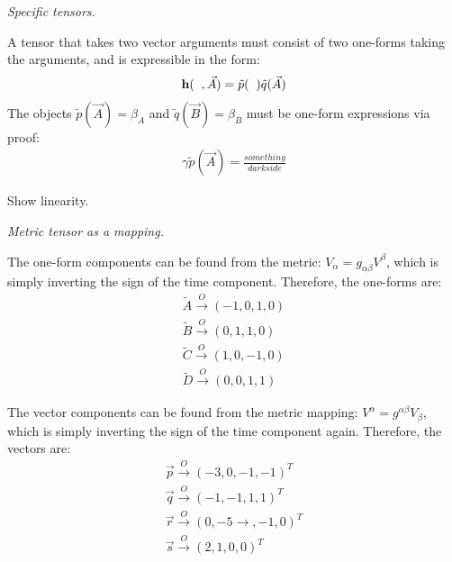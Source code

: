 \documentclass{report}
\begin{document}
\begin{subquests}
	\item \emph{Specific tensors.}
	\begin{subquests}
		\item
		A tensor that takes two vector arguments must consist of two one-forms taking the arguments, and is expressible in the form:
		\begin{gather*}
			{\vb h}(\;\;,\vec A) = \tilde{p}(\;\;)\tilde{q}(\vec A)
		\end{gather*}
		The objects $\tilde{p}(\vec A) = \beta_{A}$ and $\tilde{q}(\vec B) = \beta_B$ must be one-form expressions via proof:
		\begin{gather*}
			\gamma \tilde{p}(\vec A) = \frac{something}{darkside} 	
		\end{gather*}

		\item Show linearity.
	\end{subquests}

	\item \emph{Metric tensor as a mapping.}
	\begin{subquests}
		\item
		The one-form components can be found from the metric: $V_{\alpha} = g_{\alpha\beta}V^{\beta}$, which is simply inverting the sign of the time component. Therefore, the one-forms are:
		\begin{gather*}
			\tilde A \stackrel{O}\longrightarrow (-1, 0, 1, 0) \\
			\tilde B \stackrel{O}\longrightarrow (0, 1, 1, 0) \\
			\tilde C \stackrel{O}\longrightarrow (1, 0, -1, 0) \\
			\tilde D \stackrel{O}\longrightarrow (0, 0, 1, 1) 
		\end{gather*}
		
		\item The vector components can be found from the metric mapping: $V^{\alpha} = g^{\alpha\beta}V_{\beta}$, which is simply inverting the sign of the time component again. Therefore, the vectors are:
		\begin{gather*}
			\vec p \stackrel{O}\longrightarrow (-3, 0, -1, -1)^T \\
			\vec q \stackrel{O}\longrightarrow (-1, -1, 1, 1)^T \\
			\vec r \stackrel{O}\longrightarrow (0, -5→, -1, 0)^T \\
			\vec s \stackrel{O}\longrightarrow (2, 1, 0, 0)^T
		\end{gather*}
	\end{subquests}


\end{subquests}
\end{document}
